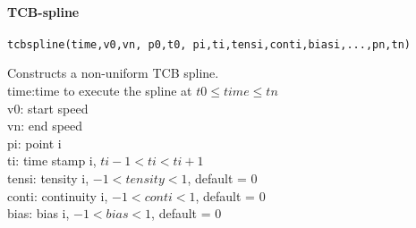 \paragraph{TCB-spline}
\begin{verbatim}
tcbspline(time,v0,vn, p0,t0, pi,ti,tensi,conti,biasi,...,pn,tn)
\end{verbatim}
Constructs a non-uniform TCB spline.\\
time:time to execute the spline at $t0 \leq time \leq tn$\\
v0:  start speed\\
vn:  end speed\\
pi:  point i\\
ti:  time stamp i, $ti-1<ti<ti+1$\\
tensi: tensity i, $-1<tensity<1$, default = 0 \\
conti: continuity i, $-1<conti<1$, default = 0 \\
bias:  bias i, $-1<bias<1$, default = 0\\


